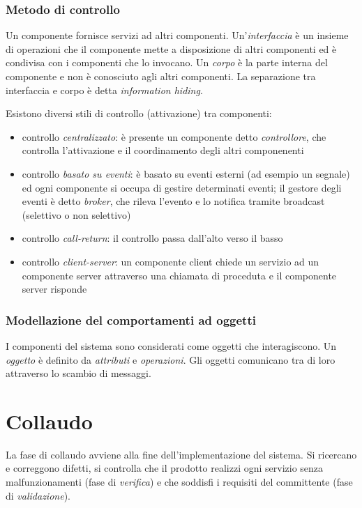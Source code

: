 \documentclass[11pt]{article}
\begin{document}
\subsubsection*{Metodo di controllo}
Un componente fornisce servizi ad altri componenti. Un'\textit{interfaccia} è un insieme di operazioni che il componente
mette a disposizione di altri componenti ed è condivisa con i componenti che lo invocano. Un \textit{corpo} è la parte 
interna del componente e non è conosciuto agli altri componenti. La separazione tra interfaccia e corpo è detta 
\textit{information hiding}.

Esistono diversi stili di controllo (attivazione) tra componenti:
\begin{itemize}
    \item controllo \textit{centralizzato}: è presente un componente detto \textit{controllore}, che controlla l'attivazione 
    e il coordinamento degli altri componenenti
    \item controllo \textit{basato su eventi}: è basato su eventi esterni (ad esempio un segnale) ed ogni componente si
    occupa di gestire determinati eventi; il gestore degli eventi è detto \textit{broker}, che rileva l'evento e lo notifica 
    tramite broadcast (selettivo o non selettivo)
    \item controllo \textit{call-return}: il controllo passa dall'alto verso il basso
    \item controllo \textit{client-server}: un componente client chiede un servizio ad un componente server attraverso 
    una chiamata di proceduta e il componente server risponde
\end{itemize}
\subsubsection*{Modellazione del comportamenti ad oggetti}
I componenti del sistema sono considerati come oggetti che interagiscono. Un \textit{oggetto} è definito da \textit{attributi} e 
\textit{operazioni}. Gli oggetti comunicano tra di loro attraverso lo scambio di messaggi.
\section{Collaudo}
La fase di collaudo avviene alla fine dell'implementazione del sistema. Si ricercano e correggono difetti, si controlla 
che il prodotto realizzi ogni servizio senza malfunzionamenti (fase di \textit{verifica}) e che soddisfi i requisiti del 
committente (fase di \textit{validazione}).
\end{document}
